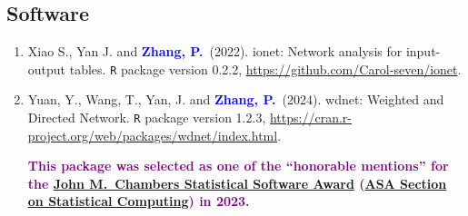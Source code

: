 \documentclass[12pt]{article}
\newcommand{\PZnot}{\textcolor{blue}{\textbf{Zhang, P.}}}
\newcommand{\purple}[1]{\textcolor{purple}{#1}}
\begin{document}
	\subsection*{Software}
	\begin{enumerate}
		\item{\sc Xiao S., Yan J.} and \PZnot\ (2022).
		ionet: Network analysis for input-output tables. {\tt R} 
		package version 0.2.2, 
		\url{https://github.com/Carol-seven/ionet}.
		
		\item {\sc Yuan, Y., Wang, T., Yan, J.} and \PZnot\ (2024). 
		wdnet: Weighted and Directed Network. {\tt R} package 
		version 
		1.2.3, 
		\url{https://cran.r-project.org/web/packages/wdnet/index.html}.
		
		\purple{\bf This package was selected as one of the 
		``honorable mentions'' for the  
		\href{https://community.amstat.org/jointscsg-section/awards/john-m-chambers}{John
		 M.\ Chambers Statistical Software Award} 
		 (\href{https://community.amstat.org/jointscsg-section/home}{ASA
		  Section on Statistical Computing}) in 2023.}
	\end{enumerate}
	
\end{document}

